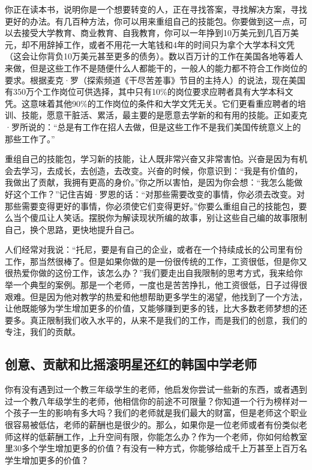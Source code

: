 你正在读本书，说明你是一个想要转变的人，正在寻找答案，寻找解决方案，寻找更好的办法。有几百种方法，你可以用来重组自己的技能包。你要做到这一点，可以去接受大学教育、商业教育、自我教育，你可以一年挣到10万美元到几百万美元，却不用辞掉工作，或者不用花一大笔钱和4年的时间只为拿个大学本科文凭（这会让你背负10万美元甚至更多的债务）。数以百万计的工作在美国各地等着人来做，但是这些工作不是随便什么人都能干的，一般人的能力都不符合工作岗位的要求。根据麦克·罗（探索频道《干尽苦差事》节目的主持人）的说法，现在美国有350万个工作岗位可供选择，其中只有10\%的岗位要求应聘者具有大学本科文凭。这意味着其他90\%的工作岗位的条件和大学文凭无关。它们更看重应聘者的培训、技能，愿意干脏活、累活，最主要的是愿意去学新的和有用的技能。正如麦克·罗所说的：“总是有工作在招人去做，但是这些工作不是我们美国传统意义上的那些工作了。”

重组自己的技能包，学习新的技能，让人既非常兴奋又非常害怕。兴奋是因为有机会去学习，去成长，去创造，去改变。兴奋的时候，你意识到：“我是有价值的，我做出了贡献，我拥有更高的身价。”你之所以害怕，是因为你会想：“我怎么能做好这个工作？”记住吉姆·罗恩的话：“对那些需要改变的事情，你必须去改变。对那些需要变得更好的事情，你必须使它们变得更好。”你要么重组自己的技能包，要么当个傻瓜让人笑话。摆脱你为解读现状所编的故事，别让这些自己编的故事限制自己，换个思路，更快地提升自己。

人们经常对我说：“托尼，要是有自己的企业，或者在一个持续成长的公司里有份工作，那当然很棒了。但是如果你做的是一份很传统的工作，工资很低，但是你又很热爱你做的这份工作，该怎么办？”我们要走出自我限制的思考方式，我来给你举一个典型的案例。那是一个老师，一度也是苦苦挣扎，他工资很低，日子过得很艰难。但是因为他对教学的热爱和他想帮助更多学生的渴望，他找到了一个方法，让他既能够为学生增加更多的价值，又能够赚到更多的钱，比大多数老师梦想的还要多。真正限制我们收入水平的，从来不是我们的工作，而是我们的创意，我们的专注，我们的贡献。

\subsection{创意、贡献和比摇滚明星还红的韩国中学老师}

你有没有遇到过一个教三年级学生的老师，他启发你尝试一些新的东西，或者遇到过一个教八年级学生的老师，他相信你的前途不可限量？你知道一个行为榜样对一个孩子一生的影响有多大吗？我们的老师就是我们最大的财富，但是老师这个职业很容易被低估，老师的薪酬也是很少的。那么，如果你是一位老师或者有份类似老师这样的低薪酬工作，上升空间有限，你能怎么办？作为一个老师，你如何给教室里30多个学生增加更多的价值？有没有一种方式，你能够给成千上万甚至上百万名学生增加更多的价值？

